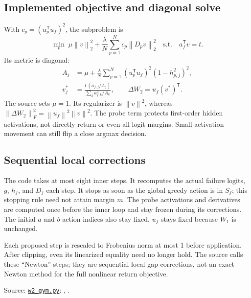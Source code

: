 \documentclass[11pt]{article}
\newcommand{\norm}[1]{\left\lVert#1\right\rVert}
\newcommand{\code}[1]{\texttt{\detokenize{#1}}}
\newcommand{\source}[2]{\href{https://github.com/HarleyCoops/KimiBrainSurgery/blob/13cfaec9f484a1a8864349a814bfd62905022a05/#1}{\nolinkurl{#1}}: #2}
\begin{document}
\subsection*{Implemented objective and diagonal solve}
With $c_p=(u_p^{\mathsf T}u_f)^2$, the subproblem is
\begin{equation}
 \min_v\;\mu\norm{v}_2^2+
 \frac{\lambda}{N}\sum_{p=1}^N c_p\norm{D_pv}_2^2
 \quad\text{s.t.}\quad a_f^{\mathsf T}v=t.
\end{equation}
Its metric is diagonal:
\begin{align}
 A_j&=\mu+\frac{\lambda}{N}\sum_{p=1}^N
       (u_p^{\mathsf T}u_f)^2(1-h_{p,j}^2)^2,\nonumber\\
 v_j^*&=\frac{t\,(a_{f,j}/A_j)}{\sum_k a_{f,k}^2/A_k},
 \qquad \Delta W_2=u_f(v^*)^{\mathsf T}.
 \label{eq:rankone}
\end{align}
The source sets $\mu=1$. Its regularizer is $\norm{v}^2$, whereas
$\norm{\Delta W_2}_F^2=\norm{u_f}^2\norm{v}^2$.
The probe term protects first-order hidden activations, not directly return
or even all logit margins. Small activation movement can still flip a close
argmax decision.

\subsection*{Sequential local corrections}
The code takes at most eight inner steps. It recomputes the actual failure
logits, $g$, $h_f$, and $D_f$ each step. It stops as soon as the global greedy
action is in $S_f$; this stopping rule need not attain margin $m$.
The probe activations and derivatives are computed once before the inner loop
and stay frozen during its corrections. The initial $a$ and $b$ action indices
also stay fixed. $u_f$ stays fixed because $W_1$ is unchanged.

Each proposed step is rescaled to Frobenius norm at most 1 before application.
After clipping, even its linearized equality need no longer hold. The source
calls these ``Newton'' steps; they are sequential local gap corrections, not
an exact Newton method for the full nonlinear return objective.

\small Source: \source{w2_gym.py}{\code{solve_w2}, \code{probe_stats}}.

\clearpage
\normalsize
\end{document}
